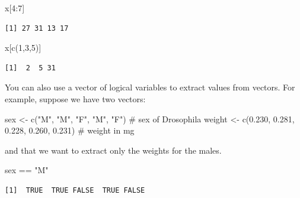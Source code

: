 \documentclass[
  letterpaper,
  DIV=11,
  numbers=noendperiod]{scrreprt}
\newenvironment{Shaded}{\begin{snugshade}}{\end{snugshade}}
\newcommand{\CommentTok}[1]{\textcolor[rgb]{0.37,0.37,0.37}{#1}}
\newcommand{\DecValTok}[1]{\textcolor[rgb]{0.68,0.00,0.00}{#1}}
\newcommand{\FloatTok}[1]{\textcolor[rgb]{0.68,0.00,0.00}{#1}}
\newcommand{\FunctionTok}[1]{\textcolor[rgb]{0.28,0.35,0.67}{#1}}
\newcommand{\NormalTok}[1]{\textcolor[rgb]{0.00,0.23,0.31}{#1}}
\newcommand{\OtherTok}[1]{\textcolor[rgb]{0.00,0.23,0.31}{#1}}
\newcommand{\SpecialCharTok}[1]{\textcolor[rgb]{0.37,0.37,0.37}{#1}}
\newcommand{\StringTok}[1]{\textcolor[rgb]{0.13,0.47,0.30}{#1}}
\begin{document}
\begin{Shaded}
\begin{Highlighting}[]
\NormalTok{x[}\DecValTok{4}\SpecialCharTok{:}\DecValTok{7}\NormalTok{]}
\end{Highlighting}
\end{Shaded}

\begin{verbatim}
[1] 27 31 13 17
\end{verbatim}

\begin{Shaded}
\begin{Highlighting}[]
\NormalTok{x[}\FunctionTok{c}\NormalTok{(}\DecValTok{1}\NormalTok{,}\DecValTok{3}\NormalTok{,}\DecValTok{5}\NormalTok{)]}
\end{Highlighting}
\end{Shaded}

\begin{verbatim}
[1]  2  5 31
\end{verbatim}

You can also use a vector of logical variables to extract values from
vectors. For example, suppose we have two vectors:

\begin{Shaded}
\begin{Highlighting}[]
\NormalTok{sex }\OtherTok{\textless{}{-}} \FunctionTok{c}\NormalTok{(}\StringTok{"M"}\NormalTok{, }\StringTok{"M"}\NormalTok{, }\StringTok{"F"}\NormalTok{, }\StringTok{"M"}\NormalTok{, }\StringTok{"F"}\NormalTok{) }\CommentTok{\# sex of Drosophila}
\NormalTok{weight }\OtherTok{\textless{}{-}} \FunctionTok{c}\NormalTok{(}\FloatTok{0.230}\NormalTok{, }\FloatTok{0.281}\NormalTok{, }\FloatTok{0.228}\NormalTok{, }\FloatTok{0.260}\NormalTok{, }\FloatTok{0.231}\NormalTok{) }\CommentTok{\# weight in mg}
\end{Highlighting}
\end{Shaded}

and that we want to extract only the weights for the males.

\begin{Shaded}
\begin{Highlighting}[]
\NormalTok{sex }\SpecialCharTok{==} \StringTok{"M"}
\end{Highlighting}
\end{Shaded}

\begin{verbatim}
[1]  TRUE  TRUE FALSE  TRUE FALSE
\end{verbatim}
\end{document}
